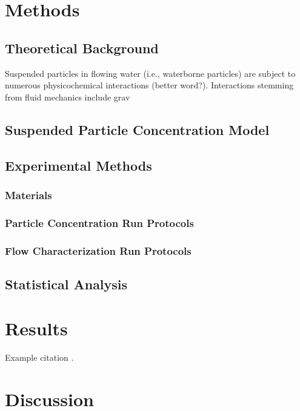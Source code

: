 \documentclass[10pt,a4paper]{article}
\begin{document}
\section{Methods}

\subsection{Theoretical Background}

Suspended particles in flowing water (i.e., waterborne particles) are subject to numerous physicochemical interactions \textcolor{red!75!green}{(better word?)}. Interactions stemming from fluid mechanics include grav



\subsection{Suspended Particle Concentration Model}



\subsection{Experimental Methods}



\subsubsection{Materials}



\subsubsection{Particle Concentration Run Protocols}



\subsubsection{Flow Characterization Run Protocols}



\subsection{Statistical Analysis}



\section{Results}

Example citation \citep{Fauria_2015}.



\section{Discussion}





\end{document}
